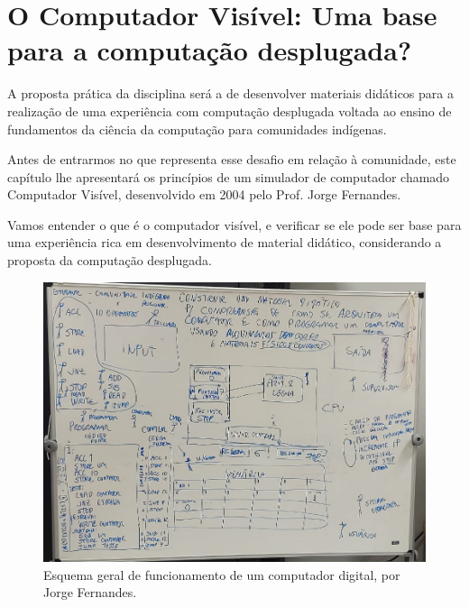 \chapter{O Computador Visível: Uma base para a computação desplugada?} 

A proposta prática da disciplina será a de desenvolver materiais didáticos para a realização de uma experiência com computação desplugada voltada ao ensino de fundamentos da ciência da computação para comunidades indígenas.

Antes de entrarmos no que representa esse desafio em relação à comunidade, este capítulo lhe apresentará os princípios de um simulador de computador chamado Computador Visível, desenvolvido em 2004 pelo Prof. Jorge Fernandes.

Vamos entender o que é o computador visível, e verificar se ele pode ser base para uma experiência rica em desenvolvimento de material didático, considerando a proposta da computação desplugada.

\begin{figure}
    \centering
    \includegraphics[width=1\textwidth]{2-ComputadorVisivel/imgs/vc0-conversa-livia.jpeg}
    \caption{Esquema geral de funcionamento de um computador digital, por Jorge Fernandes.}
    \label{fig:vc0}
\end{figure}

